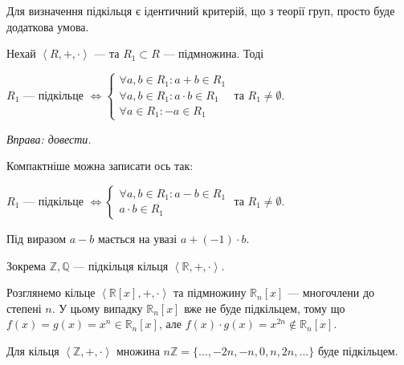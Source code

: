 \documentclass{math_library}
\begin{document}
Для визначення підкільця є ідентичний критерій, що з теорії груп, просто буде додаткова умова.

\begin{theorem}
\label{subring_criterion}
Нехай $\left<R,+, \cdot \right>$ --- та $R_1 \subset R$ --- підмножина. Тоді
\begin{center}
$R_1$ --- підкільце $\iff \begin{cases} \forall a,b \in R_1: a+b \in R_1 \\ \forall a,b \in R_1: a \cdot b \in R_1 \\ \forall a \in R_1: -a \in R_1 \end{cases}$ та $R_1 \neq \emptyset$.
\end{center}
\textit{Вправа: довести.}
\end{theorem}

\begin{corollary}
Компактніше можна записати ось так:
\begin{center}
$R_1$ --- підкільце $\iff \begin{cases} \forall a,b \in R_1: a-b \in R_1 \\ a \cdot b \in R_1 \end{cases}$ та $R_1 \neq \emptyset$.
\end{center}
\end{corollary}

\begin{remark}
Під виразом $a-b$ мається на увазі $a + (-1) \cdot b$.
\end{remark}

\begin{example}
Зокрема $\mathbb{Z}, \mathbb{Q}$ --- підкільця кільця $\left< \mathbb{R},+,\cdot \right>$.
\end{example}

\begin{example}
Розглянемо кільце $\left<\mathbb{R}[x], +, \cdot \right>$ та 
підмножину $\mathbb{R}_n[x]$ --- многочлени до степені $n$. У цьому випадку $\mathbb{R}_n[x]$ вже не буде підкільцем, тому що $f(x) = g(x) = x^n \in \mathbb{R}_n[x]$, але $f(x) \cdot g(x) = x^{2n} \not \in \mathbb{R}_n[x]$.
\end{example}

\begin{example}
Для кільця $\left<\mathbb{Z},+,\cdot \right>$ множина $n\mathbb{Z} = \{\dots,-2n,-n,0,n,2n,\dots\}$ буде підкільцем.
\end{example}
\end{document}
